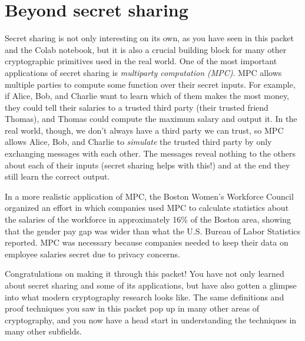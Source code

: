 \section{Beyond secret sharing}

Secret sharing is not only interesting on its own, as you have seen in this packet and the Colab notebook, but it is also a crucial building block for many other cryptographic primitives used in the real world. One of the most important applications of secret sharing is \emph{multiparty computation (MPC)}. MPC allows multiple parties to compute some function over their secret inputs. For example, if Alice, Bob, and Charlie want to learn which of them makes the most money, they could tell their salaries to a trusted third party (their trusted friend Thomas), and Thomas could compute the maximum salary and output it. In the real world, though, we don't always have a third party we can trust, so MPC allows Alice, Bob, and Charlie to \emph{simulate} the trusted third party by only exchanging messages with each other. The messages reveal nothing to the others about each of their inputs (secret sharing helps with this!) and at the end they still learn the correct output.

In a more realistic application of MPC, the Boston Women’s Workforce Council organized an effort in which companies used MPC\cite[page 12]{bwwc} to calculate statistics about the salaries of the workforce in approximately 16\% of the Boston area, showing that the gender pay gap was wider than what the U.S. Bureau of Labor Statistics reported\cite{bwwc}. MPC was necessary because companies needed to keep their data on employee salaries secret due to privacy concerns.

Congratulations on making it through this packet! You have not only learned about secret sharing and some of its applications, but have also gotten a glimpse into what modern cryptography research looks like. The same definitions and proof techniques you saw in this packet pop up in many other areas of cryptography, and you now have a head start in understanding the techniques in many other subfields.